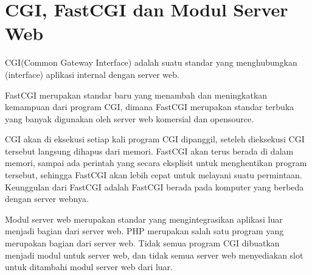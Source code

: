 \section{CGI, FastCGI dan Modul Server Web}
CGI(Common Gateway Interface) adalah suatu standar yang menghubungkan (interface) aplikasi internal dengan server web.  
\par
FastCGI merupakan standar baru yang menambah dan meningkatkan kemampuan dari program CGI, dimana FastCGI merupakan standar  terbuka yang banyak digunakan oleh server web komersial dan opensource.
\par
CGI akan di eksekusi setiap  kali program CGI dipanggil, seteleh dieksekusi CGI tersebut langsung dihapus dari memori. FastCGI akan terus berada di dalam memori, sampai ada perintah  yang secara eksplisit untuk menghentikan program tersebut, sehingga FastCGI akan lebih cepat untuk melayani suatu permintaan. Keunggulan dari FastCGI adalah FastCGI  berada pada komputer yang berbeda dengan server webnya.
\par
Modul server web merupakan standar yang mengintegrasikan aplikasi luar menjadi bagian dari server web. PHP merupakan salah satu program yang merupakan bagian dari server web. Tidak semua program CGI dibuatkan menjadi modul untuk server web, dan tidak semua server web menyediakan slot untuk ditambahi modul server web dari luar. 
